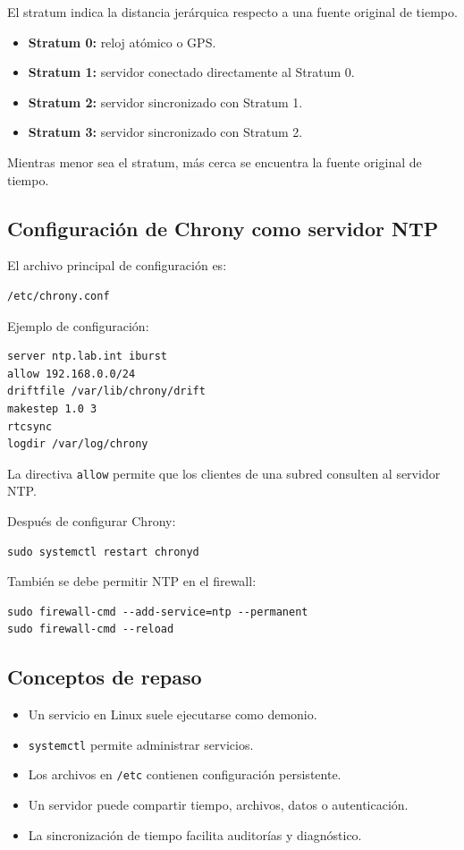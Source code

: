 \documentclass[11pt, letterpaper]{article}
\begin{document}
El stratum indica la distancia jerárquica respecto a una fuente original de tiempo.

\begin{itemize}
\item \textbf{Stratum 0:} reloj atómico o GPS.
\item \textbf{Stratum 1:} servidor conectado directamente al Stratum 0.
\item \textbf{Stratum 2:} servidor sincronizado con Stratum 1.
\item \textbf{Stratum 3:} servidor sincronizado con Stratum 2.
\end{itemize}

Mientras menor sea el stratum, más cerca se encuentra la fuente original de tiempo.
\subsection{Configuración de Chrony como servidor NTP}
\label{sec:org4017183}

El archivo principal de configuración es:

\begin{verbatim}
/etc/chrony.conf
\end{verbatim}

Ejemplo de configuración:

\begin{verbatim}
server ntp.lab.int iburst
allow 192.168.0.0/24
driftfile /var/lib/chrony/drift
makestep 1.0 3
rtcsync
logdir /var/log/chrony
\end{verbatim}

La directiva \texttt{allow} permite que los clientes de una subred consulten al servidor NTP.

Después de configurar Chrony:

\begin{verbatim}
sudo systemctl restart chronyd
\end{verbatim}

También se debe permitir NTP en el firewall:

\begin{verbatim}
sudo firewall-cmd --add-service=ntp --permanent
sudo firewall-cmd --reload
\end{verbatim}
\subsection{Conceptos de repaso}
\label{sec:orge6d4f76}

\begin{itemize}
\item Un servicio en Linux suele ejecutarse como demonio.
\item \texttt{systemctl} permite administrar servicios.
\item Los archivos en \texttt{/etc} contienen configuración persistente.
\item Un servidor puede compartir tiempo, archivos, datos o autenticación.
\item La sincronización de tiempo facilita auditorías y diagnóstico.
\end{itemize}
\end{document}
